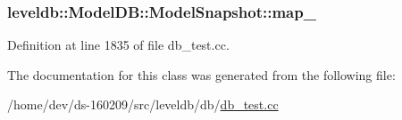 \subsubsection[{map\+\_\+}]{ leveldb\+::\+Model\+D\+B\+::\+Model\+Snapshot\+::map\+\_\+}\label{classleveldb_1_1_model_d_b_1_1_model_snapshot_a7ae02397c293072b78874d0c073a10c5}


Definition at line 1835 of file db\+\_\+test.\+cc.



The documentation for this class was generated from the following file\+:\begin{DoxyCompactItemize}
\item 
/home/dev/ds-\/160209/src/leveldb/db/\hyperlink{db__test_8cc}{db\+\_\+test.\+cc}\end{DoxyCompactItemize}
